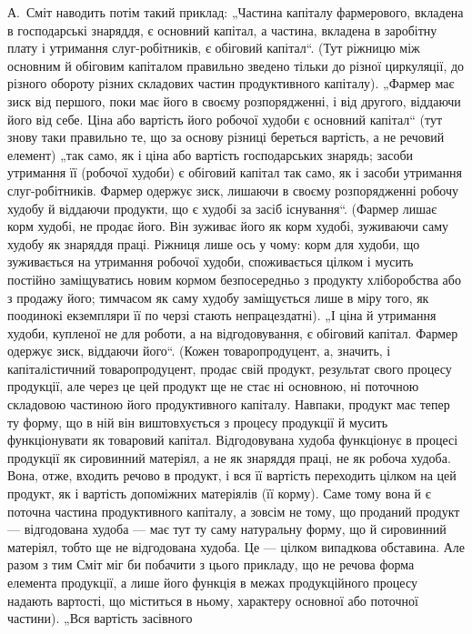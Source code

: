 А.~Сміт наводить потім такий приклад: „Частина капіталу фармерового,
вкладена в господарські знаряддя, є основний капітал, а частина,
вкладена в заробітну плату і утримання слуг-робітників, є обіговий капітал“.
(Тут ріжницю між основним й обіговим капіталом правильно зведено
тільки до різної циркуляції, до різного обороту різних складових
частин продуктивного капіталу). „Фармер має зиск від першого, поки має
його в своєму розпорядженні, і від другого, віддаючи його від себе.
Ціна або вартість його робочої худоби є основний капітал“ (тут знову таки
правильно те, що за основу різниці береться вартість, а не речовий
елемент) „так само, як і ціна або вартість господарських знарядь; засоби
утримання її (робочої худоби) є обіговий капітал так само, як і засоби
утримання слуг-робітників. Фармер одержує зиск, лишаючи в своєму
розпорядженні робочу худобу й віддаючи продукти, що є худобі за засіб
існування“. (Фармер лишає корм худобі, не продає його. Він зуживає
його як корм худобі, зуживаючи саму худобу як знаряддя праці.
Ріжниця лише ось у чому: корм для худоби, що зуживається на утримання
робочої худоби, споживається цілком і мусить постійно заміщуватись
новим кормом безпосередньо з продукту хліборобства або з продажу
його; тимчасом як саму худобу заміщується лише в міру того, як
поодинокі екземпляри її по черзі стають непрацездатні). „І ціна й утримання
худоби, купленої не для роботи, а на відгодовування, є обіговий капітал.
Фармер одержує зиск, віддаючи його“. (Кожен товаропродуцент,
а, значить, і капіталістичний товаропродуцент, продає свій продукт,
результат свого процесу продукції, але через це цей продукт
ще не стає ні основною, ні поточною складовою частиною його
продуктивного капіталу. Навпаки, продукт має тепер ту форму, що
в ній він виштовхується з процесу продукції й мусить функціонувати як товаровий
капітал. Відгодовувана худоба функціонує в процесі продукції як
сировинний матеріял, а не як знаряддя праці, не як робоча худоба. Вона,
отже, входить речово в продукт, і вся її вартість переходить цілком
на цей продукт, як і вартість допоміжних матеріялів (її корму). Саме тому
вона й є поточна частина продуктивного капіталу, а зовсім не тому,
що проданий продукт — відгодована худоба — має тут ту саму натуральну
форму, що й сировинний матеріял, тобто ще не відгодована худоба. Це —
цілком випадкова обставина. Але разом з тим Сміт міг би побачити з
цього прикладу, що не речова форма елемента продукції, а лише його
функція в межах продукційного процесу надають вартості, що міститься
в ньому, характеру основної або поточної частини). „Вся вартість засівного
